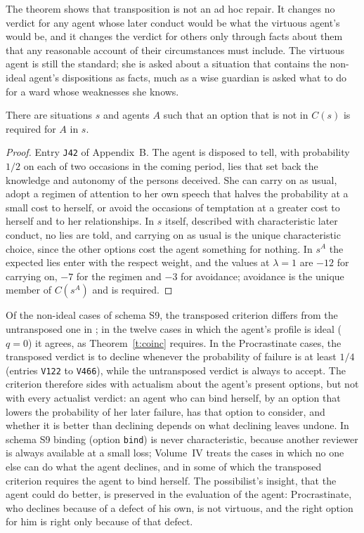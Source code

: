 \documentclass{situationist-preprint}
\newcommand{\Ch}{C}
\begin{document}
The theorem shows that transposition is not an ad hoc repair. It changes no verdict for any agent whose later conduct would be what the virtuous agent's would be, and it changes the verdict for others only through facts about them that any reasonable account of their circumstances must include. The virtuous agent is still the standard; she is asked about a situation that contains the non-ideal agent's dispositions as facts, much as a wise guardian is asked what to do for a ward whose weaknesses she knows.

\begin{proposition}\label{p:selfimp}
There are situations $s$ and agents $A$ such that an option that is not in $\Ch(s)$ is required for $A$ in $s$.
\end{proposition}

\begin{proof}
Entry \texttt{J42} of Appendix~B. The agent is disposed to tell, with probability $1/2$ on each of two occasions in the coming period, lies that set back the knowledge and autonomy of the persons deceived. She can carry on as usual, adopt a regimen of attention to her own speech that halves the probability at a small cost to herself, or avoid the occasions of temptation at a greater cost to herself and to her relationships. In $s$ itself, described with characteristic later conduct, no lies are told, and carrying on as usual is the unique characteristic choice, since the other options cost the agent something for nothing. In $s^A$ the expected lies enter with the respect weight, and the values at $\lambda=1$ are $-12$ for carrying on, $-7$ for the regimen and $-3$ for avoidance; avoidance is the unique member of $\Ch(s^A)$ and is required.
\end{proof}

Of the \stnnonideal{} non-ideal cases of schema S9, the transposed criterion differs from the untransposed one in \stnnaivediff{}; in the twelve cases in which the agent's profile is ideal ($q=0$) it agrees, as Theorem~\ref{t:coinc} requires. In the Procrastinate cases, the transposed verdict is to decline whenever the probability of failure is at least $1/4$ (entries \texttt{V122} to \texttt{V466}), while the untransposed verdict is always to accept. The criterion therefore sides with actualism about the agent's present options, but not with every actualist verdict: an agent who can bind herself, by an option that lowers the probability of her later failure, has that option to consider, and whether it is better than declining depends on what declining leaves undone. In schema S9 binding (option \texttt{bind}) is never characteristic, because another reviewer is always available at a small loss; Volume~IV treats the cases in which no one else can do what the agent declines, and in some of which the transposed criterion requires the agent to bind herself. The possibilist's insight, that the agent could do better, is preserved in the evaluation of the agent: Procrastinate, who declines because of a defect of his own, is not virtuous, and the right option for him is right only because of that defect.
\end{document}

